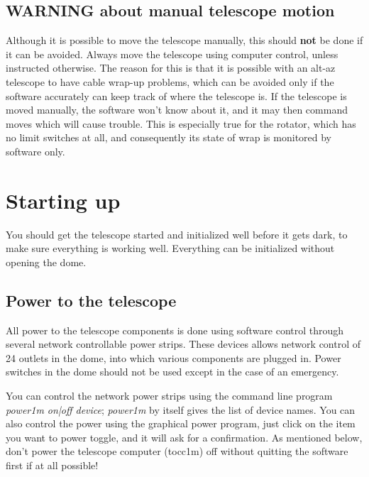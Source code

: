 \documentclass[10pt]{report}
\begin{document}

\section{WARNING about manual telescope motion}

Although it is possible to move the telescope manually, this should
\textbf{not} be done if it can be avoided. Always move the telescope using
computer control, unless instructed otherwise. The reason
for this is that it is possible with an alt-az telescope to have cable
wrap-up problems, which can be avoided only if the software accurately
can keep track of where the telescope is. If the telescope is moved
manually, the software won't know about it, and it may then command
moves which will cause trouble. This is especially true for the rotator,
which has no limit switches at all, and consequently its state of wrap
is monitored by software only.

\chapter{Starting up}

You should get the telescope started and initialized well before it gets
dark, to make sure everything is working well. Everything can be initialized
without opening the dome. 

\section{Power to the telescope}

All power to the telescope components is done using software control
through several network controllable power strips.  These devices
allows network control of 24 outlets in the dome, into which various
components are plugged in. Power switches in the dome should not
be used except in the case of an emergency.

You can control the network power strips using the command line program
\textit{power1m on|off device}; \textit{power1m} by itself gives the
list of device names. You can also control the power using the graphical
power program, just click on the item you want to power toggle, and it
will ask for a confirmation. As mentioned below, don't power the telescope
computer (tocc1m) off without quitting the software first if at all 
possible!
\end{document}
